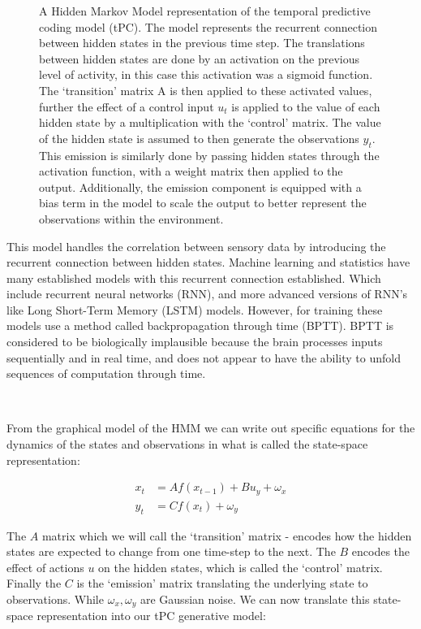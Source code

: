 \documentclass{article}
\begin{document}
\begin{figure}[h]
\begin{tikzpicture}
    \end{tikzpicture}
    \caption{A Hidden Markov Model representation of the temporal predictive coding model (tPC). The model represents the recurrent connection between hidden states in the previous time step. The translations between hidden states are done by an activation on the previous level of activity, in this case this activation was a sigmoid function. The `transition' matrix A is then applied to these activated values, further the effect of a control input $u_t$ is applied to the value of each hidden state by a multiplication with the `control' matrix. The value of the hidden state is assumed to then generate the observations $y_t$. This emission is similarly done by passing hidden states through the activation function, with a weight matrix then applied to the output. Additionally, the emission component is equipped with a bias term in the model to scale the output to better represent the observations within the environment.}
    \label{fig:hmm}
\end{figure}

This model handles the correlation between sensory data by introducing the recurrent connection between hidden states. Machine learning and statistics have many established models with this recurrent connection established. Which include recurrent neural networks (RNN), and more advanced versions of RNN's like  Long Short-Term Memory (LSTM) models. However, for training these models use a method called backpropagation through time (BPTT). BPTT is considered to be biologically implausible because the brain processes inputs sequentially and in real time, and does not appear to have the ability to unfold sequences of computation through time. \citep{millidge2024temporal}

\

From the graphical model of the HMM we can write out specific equations for the dynamics of the states and observations in what is called the state-space representation:

\begin{equation}\label{eq:tpc}
	\begin{aligned}
		x_t &= A f(x_{t-1}) + B u_y + \omega_x \\
		y_t &= C f(x_t) + \omega_y
	\end{aligned}
\end{equation}

The $A$ matrix which we will call the `transition' matrix - encodes how the hidden states are expected to change from one time-step to the next. The $B$  encodes the effect of actions $u$ on the hidden states, which is called the `control' matrix. Finally the $C$ is the `emission' matrix translating the underlying state to observations. While $\omega_x, \omega_y$ are Gaussian noise. We can now translate this state-space representation into our tPC generative model:
\end{document}

